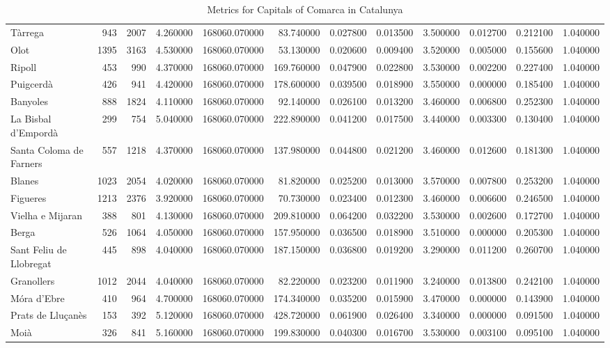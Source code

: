 \documentclass{article}
\begin{document}
\begin{table}[ht]
\begin{tabular}{lrrrrrrrrrrr}
Tàrrega & 943 & 2007 & 4.260000 & 168060.070000 & 83.740000 & 0.027800 & 0.013500 & 3.500000 & 0.012700 & 0.212100 & 1.040000 \\
Olot & 1395 & 3163 & 4.530000 & 168060.070000 & 53.130000 & 0.020600 & 0.009400 & 3.520000 & 0.005000 & 0.155600 & 1.040000 \\
Ripoll & 453 & 990 & 4.370000 & 168060.070000 & 169.760000 & 0.047900 & 0.022800 & 3.530000 & 0.002200 & 0.227400 & 1.040000 \\
Puigcerdà & 426 & 941 & 4.420000 & 168060.070000 & 178.600000 & 0.039500 & 0.018900 & 3.550000 & 0.000000 & 0.185400 & 1.040000 \\
Banyoles & 888 & 1824 & 4.110000 & 168060.070000 & 92.140000 & 0.026100 & 0.013200 & 3.460000 & 0.006800 & 0.252300 & 1.040000 \\
La Bisbal d'Empordà & 299 & 754 & 5.040000 & 168060.070000 & 222.890000 & 0.041200 & 0.017500 & 3.440000 & 0.003300 & 0.130400 & 1.040000 \\
Santa Coloma de Farners & 557 & 1218 & 4.370000 & 168060.070000 & 137.980000 & 0.044800 & 0.021200 & 3.460000 & 0.012600 & 0.181300 & 1.040000 \\
Blanes & 1023 & 2054 & 4.020000 & 168060.070000 & 81.820000 & 0.025200 & 0.013000 & 3.570000 & 0.007800 & 0.253200 & 1.040000 \\
Figueres & 1213 & 2376 & 3.920000 & 168060.070000 & 70.730000 & 0.023400 & 0.012300 & 3.460000 & 0.006600 & 0.246500 & 1.040000 \\
Vielha e Mijaran & 388 & 801 & 4.130000 & 168060.070000 & 209.810000 & 0.064200 & 0.032200 & 3.530000 & 0.002600 & 0.172700 & 1.040000 \\
Berga & 526 & 1064 & 4.050000 & 168060.070000 & 157.950000 & 0.036500 & 0.018900 & 3.510000 & 0.000000 & 0.205300 & 1.040000 \\
Sant Feliu de Llobregat & 445 & 898 & 4.040000 & 168060.070000 & 187.150000 & 0.036800 & 0.019200 & 3.290000 & 0.011200 & 0.260700 & 1.040000 \\
Granollers & 1012 & 2044 & 4.040000 & 168060.070000 & 82.220000 & 0.023200 & 0.011900 & 3.240000 & 0.013800 & 0.242100 & 1.040000 \\
Móra d'Ebre & 410 & 964 & 4.700000 & 168060.070000 & 174.340000 & 0.035200 & 0.015900 & 3.470000 & 0.000000 & 0.143900 & 1.040000 \\
Prats de Lluçanès & 153 & 392 & 5.120000 & 168060.070000 & 428.720000 & 0.061900 & 0.026400 & 3.340000 & 0.000000 & 0.091500 & 1.040000 \\
Moià & 326 & 841 & 5.160000 & 168060.070000 & 199.830000 & 0.040300 & 0.016700 & 3.530000 & 0.003100 & 0.095100 & 1.040000 \\
\bottomrule
\end{tabular}
\caption{Metrics for Capitals of Comarca in Catalunya}
\label{tab:metrics}
\end{table}
\end{document}
